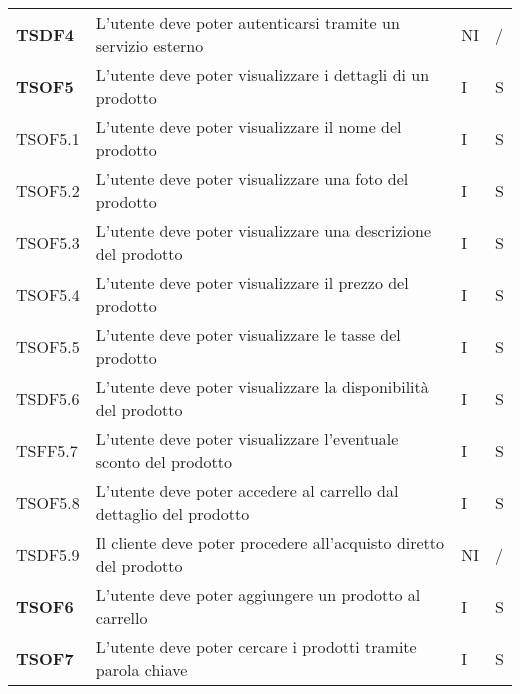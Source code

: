 \begin{center}
\begin{longtable}[!h]{p{60px} p{240px} p{35px} p{35px}}
        \textbf{TSDF4}  & L'utente deve poter autenticarsi tramite un servizio esterno                                        & NI             & /              \\
        \textbf{TSOF5}  & L'utente deve poter visualizzare i dettagli di un prodotto                                          & I              & S              \\
        TSOF5.1         & L'utente deve poter visualizzare il nome del prodotto                                               & I              & S              \\
        TSOF5.2         & L'utente deve poter visualizzare una foto del prodotto                                              & I              & S              \\
        TSOF5.3         & L'utente deve poter visualizzare una descrizione del prodotto                                       & I              & S              \\
        TSOF5.4         & L'utente deve poter visualizzare il prezzo del prodotto                                             & I              & S              \\
        TSOF5.5         & L'utente deve poter visualizzare le tasse del prodotto                                              & I              & S              \\
        TSDF5.6         & L'utente deve poter visualizzare la disponibilità del prodotto                                      & I              & S              \\
        TSFF5.7         & L'utente deve poter visualizzare l'eventuale sconto del prodotto                                    & I              & S              \\
        TSOF5.8         & L'utente deve poter accedere al carrello dal dettaglio del prodotto                                 & I              & S              \\
        TSDF5.9         & Il cliente deve poter procedere all'acquisto diretto del prodotto                                   & NI             & /              \\
        \textbf{TSOF6}  & L'utente deve poter aggiungere un prodotto al carrello                                              & I              & S              \\
        \textbf{TSOF7}  & L'utente deve poter cercare i prodotti tramite parola chiave                                        & I              & S              \\

\end{longtable}
\end{center}
